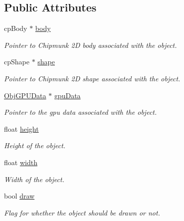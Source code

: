 \subsection*{Public Attributes}
\begin{DoxyCompactItemize}
\item 
cp\+Body $\ast$ \hyperlink{class_obj_af55b595b6ea84887b090eabfd6f1eb4f}{body}\hypertarget{class_obj_af55b595b6ea84887b090eabfd6f1eb4f}{}\label{class_obj_af55b595b6ea84887b090eabfd6f1eb4f}

\begin{DoxyCompactList}\small\item\em Pointer to Chipmunk 2D body associated with the object. \end{DoxyCompactList}\item 
cp\+Shape $\ast$ \hyperlink{class_obj_ae16105e4cfa145f0dcd9fef57cebf01d}{shape}\hypertarget{class_obj_ae16105e4cfa145f0dcd9fef57cebf01d}{}\label{class_obj_ae16105e4cfa145f0dcd9fef57cebf01d}

\begin{DoxyCompactList}\small\item\em Pointer to Chipmunk 2D shape associated with the object. \end{DoxyCompactList}\item 
\hyperlink{class_obj_g_p_u_data}{Obj\+G\+P\+U\+Data} $\ast$ \hyperlink{class_obj_a33a9a5371319a410f7d2d395a7ef2423}{gpu\+Data}\hypertarget{class_obj_a33a9a5371319a410f7d2d395a7ef2423}{}\label{class_obj_a33a9a5371319a410f7d2d395a7ef2423}

\begin{DoxyCompactList}\small\item\em Pointer to the gpu data associated with the object. \end{DoxyCompactList}\item 
float \hyperlink{class_obj_ae3f4e1cecebf1ac2c5706fe4ddc3cd5b}{height}\hypertarget{class_obj_ae3f4e1cecebf1ac2c5706fe4ddc3cd5b}{}\label{class_obj_ae3f4e1cecebf1ac2c5706fe4ddc3cd5b}

\begin{DoxyCompactList}\small\item\em Height of the object. \end{DoxyCompactList}\item 
float \hyperlink{class_obj_ae91c4644ff64eb08a2d18dc1a9bbd315}{width}\hypertarget{class_obj_ae91c4644ff64eb08a2d18dc1a9bbd315}{}\label{class_obj_ae91c4644ff64eb08a2d18dc1a9bbd315}

\begin{DoxyCompactList}\small\item\em Width of the object. \end{DoxyCompactList}\item 
bool \hyperlink{class_obj_adf0f7b5c8ca61c7cfee46c832288fa19}{draw}\hypertarget{class_obj_adf0f7b5c8ca61c7cfee46c832288fa19}{}\label{class_obj_adf0f7b5c8ca61c7cfee46c832288fa19}

\begin{DoxyCompactList}\small\item\em Flag for whether the object should be drawn or not. \end{DoxyCompactList}\end{DoxyCompactItemize}


